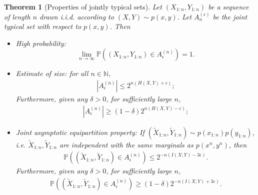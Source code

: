 \documentclass{article}
\numberwithin{equation}{section}
\newcommand{\bbN}{\mathbb{N}}
\newcommand{\bbP}{\mathbb{P}}
\newcommand{\wt}{\widetilde}
\theoremstyle{plain}
\newtheorem{theorem}{Theorem}[section]
\theoremstyle{definition}
\begin{document}
\begin{theorem}[Properties of jointly typical sets]
Let $(X_{1:n},Y_{1:n})$ be a sequence of length $n$ drawn i.i.d. according to $(X,Y)\sim p(x,y)$. Let $A_n^{(\epsilon)}$ be the joint typical set with respect to $p(x,y)$. Then
\begin{itemize}
\item[(i)] High probability: $$\lim_{n\to\infty}\bbP\left((X_{1:n},Y_{1:n})\in A_\epsilon^{(n)}\right)=1.$$
\item[(ii)] Estimate of size: for all $n\in\bbN$,
\begin{align*}
	\left\vert A_\epsilon^{(n)}\right\vert\leq 2^{n(H(X,Y)+\epsilon)};
\end{align*}
Furthermore, given any $\delta>0$, for sufficiently large $n$, 
\begin{align*}
	\left\vert A_\epsilon^{(n)}\right\vert\geq (1-\delta)2^{n(H(X,Y)-\epsilon)};
\end{align*}
\item[(iii)] Joint asymptotic equipartition property: If $(\wt{X}_{1:n},\wt{Y}_{1:n})\sim p(x_{1:n})p(y_{1:n})$, i.e. $\wt{X}_{1:n},\wt{Y}_{1:n}$ are independent with the same marginals as $p(x^n,y^n)$, then
\begin{align*}
	\bbP\left((\wt{X}_{1:n},\wt{Y}_{1:n})\in A_\epsilon^{(n)}\right)\leq 2^{-n(I(X;Y)-3\epsilon)}.
\end{align*}
Furthermore, given any $\delta>0$, for sufficiently large $n$,
\begin{align*}
	\bbP\left((\wt{X}_{1:n},\wt{Y}_{1:n})\in A_\epsilon^{(n)}\right)\geq (1-\delta)2^{-n(I(X;Y)+3\epsilon)}.
\end{align*}
\end{itemize}
\end{theorem}
\end{document}
